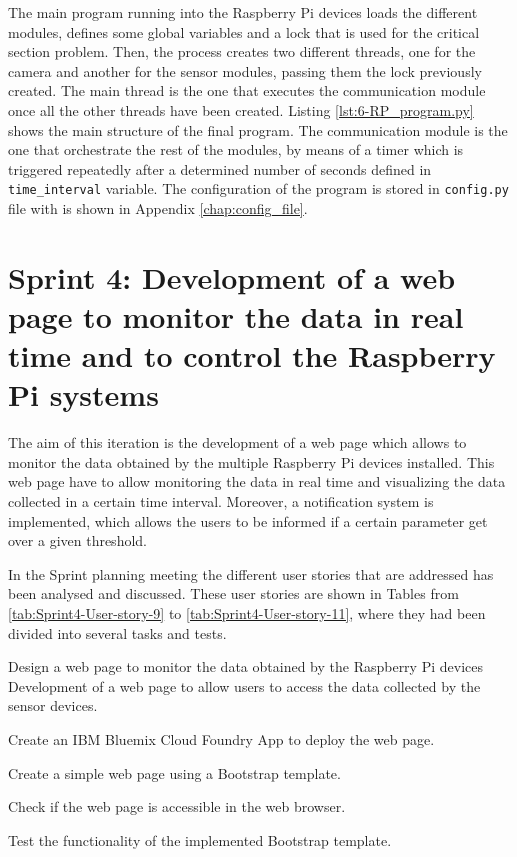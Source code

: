 

The main program running into the Raspberry Pi devices loads the different modules, defines some global variables and a lock that is used for the critical section problem. Then, the process creates two different threads, one for the camera and another for the sensor modules, passing them the lock previously created. The main thread is the one that executes the communication module once all the other threads have been created. Listing \ref{lst:6-RP_program.py} shows the main structure of the final program. The communication module is the one that orchestrate the rest of the modules, by means of a timer which is triggered repeatedly after a determined number of seconds defined in \texttt{time\_interval} variable. The configuration of the program is stored in \texttt{config.py} file with is shown in Appendix \ref{chap:config_file}.





\section{Sprint 4: Development of a web page to monitor the data in real time and to control the Raspberry Pi systems}
The aim of this iteration is the development of a web page which allows to monitor the data obtained by the multiple Raspberry Pi devices installed. This web page have to allow monitoring the data in real time and visualizing the data collected in a certain time interval. Moreover, a notification system is implemented, which allows the users to be informed if a certain parameter get over a given threshold.

In the Sprint planning meeting the different user stories that are addressed has been analysed and discussed. These user stories  are shown in Tables from \ref{tab:Sprint4-User-story-9} to \ref{tab:Sprint4-User-story-11}, where they had been divided into several tasks and tests.

{Design a web page to monitor the data obtained by the Raspberry Pi devices}
{Development of a web page to allow users to access the data collected by the sensor devices.}
{	\item Create an IBM Bluemix Cloud Foundry App to deploy the web page.
	\item Create a simple web page using a Bootstrap template.
}{	\item Check if the web page is accessible in the web browser.
	\item Test the functionality of the implemented Bootstrap template.
}

